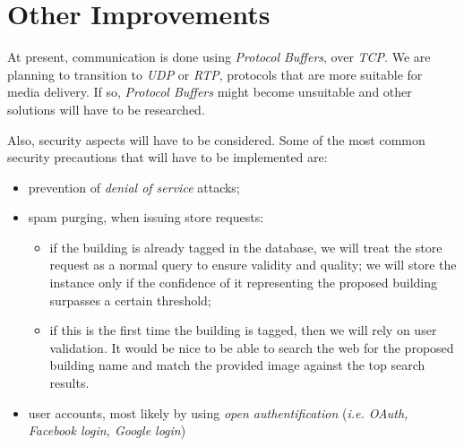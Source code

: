 \documentclass[a4paper,onecolumn,oneside,titlepage,11pt]{report}
\begin{document}
\section*{Other Improvements}
At present, communication is done using \emph{Protocol Buffers}, over \emph{TCP}. We are planning to transition to \emph{UDP} or \emph{RTP}, protocols that are more suitable for media delivery. If so, \emph{Protocol Buffers} might become unsuitable and other solutions will have to be researched.

Also, security aspects will have to be considered. Some of the most common security precautions that will have to be implemented are:
\begin{itemize}
	\item prevention of \emph{denial of service} attacks;
	\item spam purging, when issuing store requests:
	\begin{itemize}
		\item if the building is already tagged in the database, we will treat the store request as a normal query to ensure validity and quality; we will store the instance only if the confidence of it representing the proposed building surpasses a certain threshold;
		\item if this is the first time the building is tagged, then we will rely on user validation. It would be nice to be able to search the web for the proposed building name and match the provided image against the top search results.
	\end{itemize}
	\item user accounts, most likely by using \emph{open authentification} (\emph{i.e. OAuth, Facebook login, Google login})
\end{itemize}

\pagebreak
\listoffigures
\end{document}
